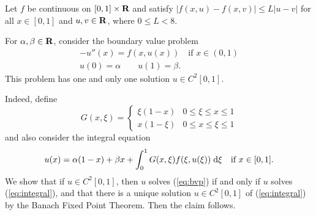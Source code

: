\documentclass{homework}
\begin{document}
	\maketitle
	
	\question Let $f$ be continuous on $[0,1] \times \textbf{R}$ and satisfy $|f(x,u) - f(x, v)| \le L |u-v|$ for all $x \in [0,1]$ and $u,v \in \textbf{R}$, where $0 \le L < 8$.
	
	For $\alpha, \beta \in \textbf{R}$, consider the boundary value problem
	\begin{equation}
		\label{eq:bvp}
		\begin{gathered}
			-u''(x) = f(x,u(x)) \quad \text{if } x \in (0,1) \\
			u(0)=\alpha \qquad u(1) = \beta.
		\end{gathered}
	\end{equation}
	This problem has one and only one solution $u \in C^2[0,1]$.
	
	Indeed, define
	\begin{equation}
		G(x,\xi) = \begin{cases}
			\xi(1-x) & 0 \le \xi \le x \le 1 \\
			x(1-\xi) & 0 \le x \le \xi \le 1
		\end{cases}
	\end{equation}
	and also consider the integral equation
	\begin{equation}
		\label{eq:integral}
		u(x) = \alpha (1-x) + \beta x + \int_0^1G(x,\xi)f(\xi, u(\xi))\;\text{d}\xi\quad\text{if } x\in [0,1].
	\end{equation}
	We show that if $u \in C^2[0,1]$, then $u$ solves (\ref{eq:bvp}) if and only if $u$ solves (\ref{eq:integral}), and that there is a unique solution $u \in C^2[0,1]$ of (\ref{eq:integral}) by the Banach Fixed Point Theorem. Then the claim follows.
	
\end{document}
